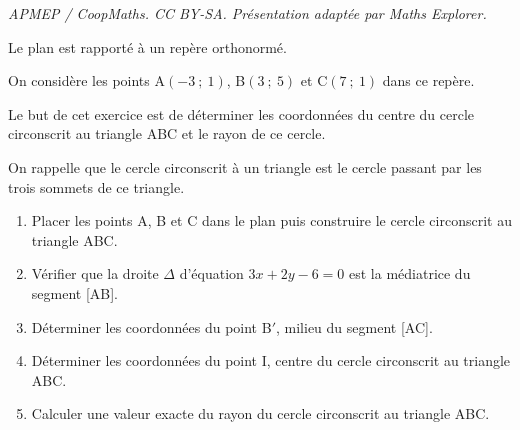 \documentclass[10pt]{article}
\begin{document}
\noindent\textit{APMEP / CoopMaths. CC BY-SA. Présentation adaptée par Maths Explorer.}\par\medskip
\medskip

Le plan est rapporté à un repère orthonormé.

On considère les points A$(-3~;~1)$, B$(3~;~5)$ et C$(7~;~1)$ dans ce repère.

Le but de cet exercice est de déterminer les coordonnées du centre du cercle circonscrit au triangle ABC et le rayon de ce cercle.

On rappelle que le cercle circonscrit à un triangle est le cercle passant par les trois sommets de ce triangle.

\medskip

\begin{enumerate}
\item Placer les points A, B et C dans le plan puis construire le cercle circonscrit au triangle ABC.
\item Vérifier que la droite $\Delta$ d'équation $3x + 2y - 6 = 0$ est la médiatrice du segment [AB]. 
\item Déterminer les coordonnées du point B$'$, milieu du segment [AC].
\item Déterminer les coordonnées du point I, centre du cercle circonscrit au triangle ABC.
\item Calculer une valeur exacte du rayon du cercle circonscrit au triangle ABC.
\end{enumerate}
\end{document}
